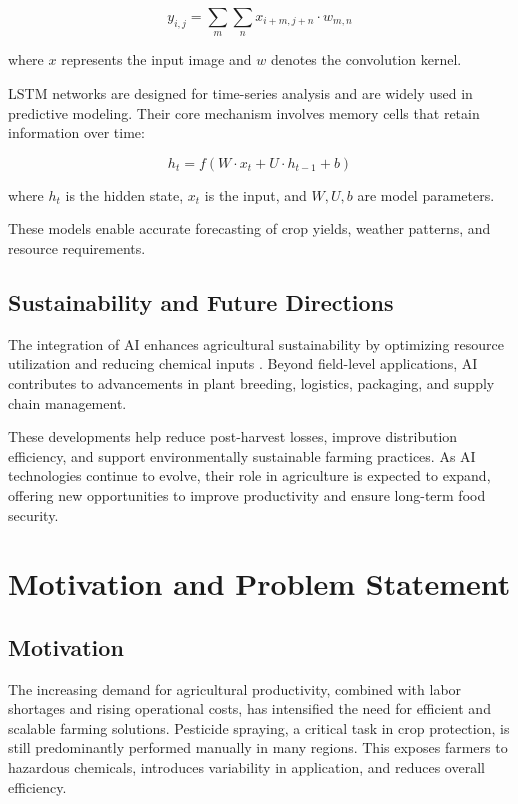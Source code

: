 \[
y_{i,j} = \sum_{m}\sum_{n} x_{i+m,j+n} \cdot w_{m,n}
\]

where \(x\) represents the input image and \(w\) denotes the convolution kernel.

LSTM networks are designed for time-series analysis and are widely used in predictive modeling. Their core mechanism involves memory cells that retain information over time:

\[
h_t = f(W \cdot x_t + U \cdot h_{t-1} + b)
\]

where \(h_t\) is the hidden state, \(x_t\) is the input, and \(W, U, b\) are model parameters.

These models enable accurate forecasting of crop yields, weather patterns, and resource requirements.

\subsection{Sustainability and Future Directions}

The integration of AI enhances agricultural sustainability by optimizing resource utilization and reducing chemical inputs \cite{Talaviya2020}. Beyond field-level applications, AI contributes to advancements in plant breeding, logistics, packaging, and supply chain management.

These developments help reduce post-harvest losses, improve distribution efficiency, and support environmentally sustainable farming practices. As AI technologies continue to evolve, their role in agriculture is expected to expand, offering new opportunities to improve productivity and ensure long-term food security.

\section{Motivation and Problem Statement}

\subsection{Motivation}

The increasing demand for agricultural productivity, combined with labor shortages and rising operational costs, has intensified the need for efficient and scalable farming solutions. Pesticide spraying, a critical task in crop protection, is still predominantly performed manually in many regions. This exposes farmers to hazardous chemicals, introduces variability in application, and reduces overall efficiency.

